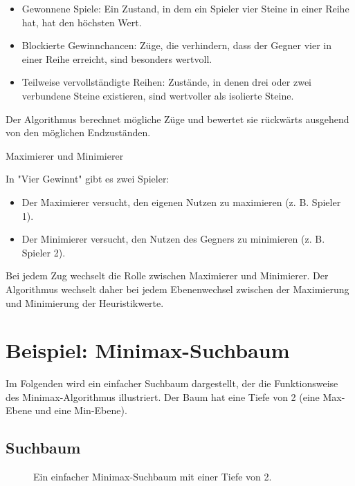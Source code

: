 \begin{itemize}
	\item Gewonnene Spiele: Ein Zustand, in dem ein Spieler vier Steine in einer Reihe hat, hat den höchsten Wert.
	\item Blockierte Gewinnchancen: Züge, die verhindern, dass der Gegner vier in einer Reihe erreicht, sind besonders wertvoll.
	\item Teilweise vervollständigte Reihen: Zustände, in denen drei oder zwei verbundene Steine existieren, sind wertvoller als isolierte Steine.
\end{itemize}

Der Algorithmus berechnet mögliche Züge und bewertet sie rückwärts ausgehend von den möglichen Endzuständen.

Maximierer und Minimierer

In "Vier Gewinnt" gibt es zwei Spieler:

\begin{itemize}
	\item Der Maximierer versucht, den eigenen Nutzen zu maximieren (z. B. Spieler 1).
	\item Der Minimierer versucht, den Nutzen des Gegners zu minimieren (z. B. Spieler 2).
\end{itemize}

Bei jedem Zug wechselt die Rolle zwischen Maximierer und Minimierer. Der Algorithmus wechselt daher bei jedem Ebenenwechsel zwischen der Maximierung und Minimierung der Heuristikwerte.

\section*{Beispiel: Minimax-Suchbaum}

Im Folgenden wird ein einfacher Suchbaum dargestellt, der die Funktionsweise des Minimax-Algorithmus illustriert. Der Baum hat eine Tiefe von 2 (eine Max-Ebene und eine Min-Ebene).

\subsection*{Suchbaum}

\begin{figure}[h!]
	\centering
	\caption{Ein einfacher Minimax-Suchbaum mit einer Tiefe von 2.}
	\label{fig:minimax-example}
\end{figure}

